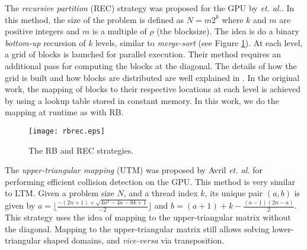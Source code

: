 \documentclass[conference]{IEEEtran}
\begin{document}
The \textit{recursive partition} (REC) strategy was proposed for the GPU by \cite{Ries:2009:TMI:1654059.1654069} \textit{et. al.}. In this method, the size of the problem is defined 
as $N = m2^k$ where $k$ and $m$ are positive integers and $m$ is a multiple of $\rho$ (the blocksize). The idea is do a binary \textit{bottom-up} recursion of $k$ levels, similar to \textit{merge-sort} (see Figure \ref{fig_other_methods}). 
At each level, a grid of blocks is launched for parallel execution. Their method requires an additional pass for computing the blocks at the diagonal. The details of how the grid is built and how blocks are distributed are well explained in 
\cite{Ries:2009:TMI:1654059.1654069}. 
In the original work, the mapping of blocks to their respective locations at each level is achieved by using a lookup table stored in constant memory. 
In this work, we do the mapping at runtime as with RB. 
\begin{figure}[ht!]
\centering
\texttt{[image: rbrec.eps]}
\caption{The RB and REC strategies.}
\label{fig_other_methods}
\end{figure}

The \textit{upper-triangular mapping} (UTM) was proposed by Avril \textit{et. al.} \cite{AvrilGA12} for performing efficient collision detection on the GPU. 
This method is very similar to LTM. Given a problem size $N$, 
and a thread index $k$, its unique pair $(a, b)$ is given by $a = \lfloor \frac{-(2n + 1) + \sqrt{4n^2 - 4n - 8k +1}}{-2} \rfloor$ and $b = (a+1) + k - \frac{(a-1)(2n-a)}{2}$. This strategy uses the idea 
of mapping to the upper-triangular matrix without the diagonal. Mapping to the upper-triangular matrix still allows solving lower-triangular shaped domains, and \textit{vice-versa} via transposition.
\end{document}
